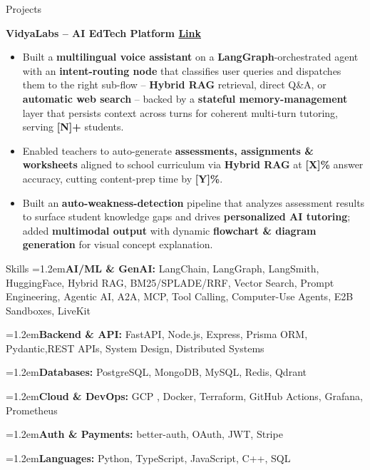 \documentclass{resume}
\begin{document}
\vspace{-0.7em}
\begin{rSection}{Projects}
\vspace{-1.3em}

\item \textbf{VidyaLabs -- AI EdTech Platform \textbar\hspace{.7mm}\href{https://vidyalabs.org}{Link}}
\begin{itemize}
    \item Built a \textbf{multilingual voice assistant} on a \textbf{LangGraph}-orchestrated agent with an \textbf{intent-routing node} that classifies
user queries and dispatches them to the right sub-flow -- \textbf{Hybrid RAG} retrieval, direct Q\&A, or \textbf{automatic web search} -- backed by a
\textbf{stateful memory-management} layer that persists context across turns for coherent multi-turn tutoring, serving \textbf{[N]+} students.
    \item Enabled teachers to auto-generate \textbf{assessments, assignments \& worksheets} aligned to school curriculum via \textbf{Hybrid RAG} at
\textbf{[X]\%} answer accuracy, cutting content-prep time by \textbf{[Y]\%}.
    \item Built an \textbf{auto-weakness-detection} pipeline that analyzes assessment results to surface student knowledge gaps and drives
\textbf{personalized AI tutoring}; added \textbf{multimodal output} with dynamic \textbf{flowchart \& diagram generation} for visual concept explanation.
\end{itemize}

\end{rSection}

\vspace{-0.5em}
\begin{rSection}{Skills}
\vspace{-0.5em}
\newcommand{\skillrow}[2]{%
  \noindent\hangindent=1.2em\textbf{#1:} #2\par\vspace{1pt}%
}
\skillrow{AI/ML \& GenAI}{LangChain, LangGraph, LangSmith, HuggingFace, Hybrid RAG, BM25/SPLADE/RRF, Vector Search, Prompt Engineering, Agentic AI, A2A, MCP, Tool Calling, Computer-Use Agents, E2B Sandboxes, LiveKit}
\skillrow{Backend \& API}{FastAPI, Node.js, Express,  Prisma ORM, Pydantic,REST APIs, System Design, Distributed Systems}
\skillrow{Databases}{PostgreSQL, MongoDB, MySQL, Redis, Qdrant}
\skillrow{Cloud \& DevOps}{GCP , Docker, Terraform, GitHub Actions, Grafana, Prometheus}
\skillrow{Auth \& Payments}{better-auth, OAuth, JWT, Stripe}
\skillrow{Languages}{Python, TypeScript, JavaScript, C++, SQL}
\end{rSection}
\end{document}
